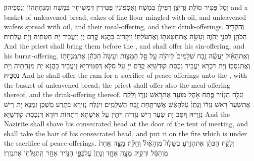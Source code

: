 {וְסַל פַּטִּיר סוֹלֶת גְּרִיצָן דְּפִילָן בִּמְשַׁח וְאֶסְפּוֹגִין פַּטִּירִין דִּמְשִׁיחִין בִּמְשַׁח וּמִנְחָתְהוֹן וְנִסְכֵּיהוֹן׃}
{and a basket of unleavened bread, cakes of fine flour mingled with oil, and unleavened wafers spread with oil, and their meal-offering, and their drink-offerings.}{}
{וְהִקְרִ֥יב הַכֹּהֵ֖ן לִפְנֵ֣י יְהֹוָ֑ה וְעָשָׂ֥ה אֶת\maqqaf חַטָּאת֖וֹ וְאֶת\maqqaf עֹלָתֽוֹ׃}
{וִיקָרֵיב כָּהֲנָא קֳדָם יְיָ וְיַעֲבֵיד יָת חַטָּתֵיהּ וְיָת עֲלָתֵיהּ׃}
{And the priest shall bring them before the \lord, and shall offer his sin-offering, and his burnt-offering.}{}
{וְאֶת\maqqaf הָאַ֜יִל יַעֲשֶׂ֨ה זֶ֤בַח שְׁלָמִים֙ לַֽיהֹוָ֔ה עַ֖ל סַ֣ל הַמַּצּ֑וֹת וְעָשָׂה֙ הַכֹּהֵ֔ן אֶת\maqqaf מִנְחָת֖וֹ וְאֶת\maqqaf נִסְכּֽוֹ׃}
{וְיָת דִּכְרָא יַעֲבֵיד נִכְסַת קוּדְשַׁיָּא קֳדָם יְיָ עַל סַלָּא דְּפַטִּירַיָּא וְיַעֲבֵיד כָּהֲנָא יָת מִנְחָתֵיהּ וְיָת נִסְכֵּיהּ׃}
{And he shall offer the ram for a sacrifice of peace-offerings unto the \lord, with the basket of unleavened bread; the priest shall offer also the meal-offering thereof, and the drink-offering thereof.}{}
{וְגִלַּ֣ח הַנָּזִ֗יר פֶּ֛תַח אֹ֥הֶל מוֹעֵ֖ד אֶת\maqqaf רֹ֣אשׁ נִזְר֑וֹ וְלָקַ֗ח אֶת\maqqaf שְׂעַר֙ רֹ֣אשׁ נִזְר֔וֹ וְנָתַן֙ עַל\maqqaf הָאֵ֔שׁ אֲשֶׁר\maqqaf תַּ֖חַת זֶ֥בַח הַשְּׁלָמִֽים׃}
{וִיגַלַּח נְזִירָא בִּתְרַע מַשְׁכַּן זִמְנָא יָת רֵישׁ נִזְרֵיהּ וְיִסַּב יָת שְׂעַר רֵישׁ נִזְרֵיהּ וְיִתֵּין עַל אִישָׁתָא דִּתְחוֹת דּוּדָא דְּנִכְסַת קוּדְשַׁיָּא׃}
{And the Nazirite shall shave his consecrated head at the door of the tent of meeting, and shall take the hair of his consecrated head, and put it on the fire which is under the sacrifice of peace-offerings.}{}
{וְלָקַ֨ח הַכֹּהֵ֜ן אֶת\maqqaf הַזְּרֹ֣עַ בְּשֵׁלָה֮ מִן\maqqaf הָאַ֒יִל֒ וְֽחַלַּ֨ת מַצָּ֤ה אַחַת֙ מִן\maqqaf הַסַּ֔ל וּרְקִ֥יק מַצָּ֖ה אֶחָ֑ד וְנָתַן֙ עַל\maqqaf כַּפֵּ֣י הַנָּזִ֔יר אַחַ֖ר הִֽתְגַּלְּח֥וֹ אֶת\maqqaf נִזְרֽוֹ׃}
